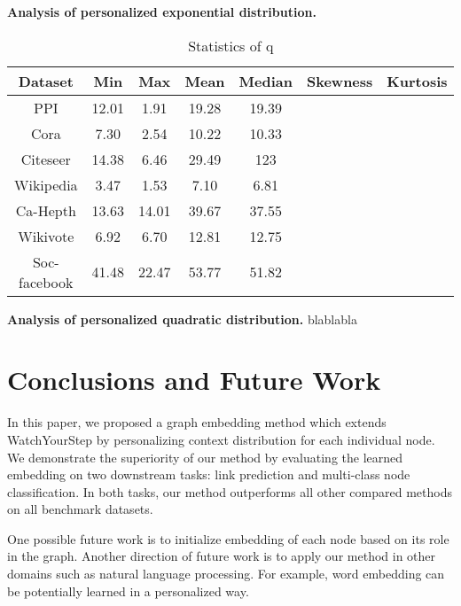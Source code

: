 \documentclass{article}
\begin{document}
\textbf{Analysis of personalized exponential distribution.} 

\begin{table}
\caption{Statistics of q}
\label{tab:analysis_q}
\centering
\begin{tabular}{ccccccc}
\toprule
Dataset & Min  & Max & Mean & Median & Skewness & Kurtosis \\
\midrule
PPI & 12.01  & 1.91 & 19.28 & 19.39 \\
Cora & 7.30  & 2.54 & 10.22 & 10.33 \\
Citeseer & 14.38  & 6.46  & 29.49 & 123 \\
Wikipedia & 3.47  & 1.53  & 7.10 & 6.81 \\
Ca-Hepth & 13.63  & 14.01  & 39.67 & 37.55 \\
Wikivote & 6.92  & 6.70  & 12.81 & 12.75\\
Soc-facebook & 41.48  & 22.47 & 53.77 & 51.82 \\

\bottomrule
\end{tabular}
\end{table}

\textbf{Analysis of personalized quadratic distribution.} blablabla


\section{Conclusions and Future Work}
In this paper, we proposed a graph embedding method which extends WatchYourStep by personalizing context distribution for each individual node. We demonstrate the superiority of our method by evaluating the learned embedding on two downstream tasks: link prediction and multi-class node classification. In both tasks, our method outperforms all other compared methods on all benchmark datasets. 

One possible future work is to initialize embedding of each node based on its role in the graph. Another direction of future work is to apply our method in other domains such as natural language processing. For example, word embedding can be potentially learned in a personalized way.



\end{document}
